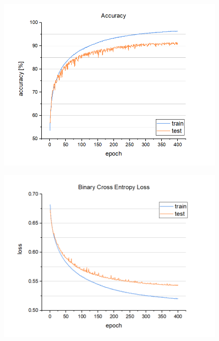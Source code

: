 \begin{figure}[!hbt]
    \centering
    \begin{minipage}{.5\textwidth}
        \centering
        \includegraphics[width=\linewidth]{resources/accuracy.PNG}
        \captionsetup{width=\linewidth}
        \label{fig:accuracy}
    \end{minipage}%
    \begin{minipage}{.5\textwidth}
        \centering
        \includegraphics[width=\linewidth]{resources/loss.PNG}
        \captionsetup{width=\linewidth}
        \label{fig:loss}
    \end{minipage}
\end{figure}


